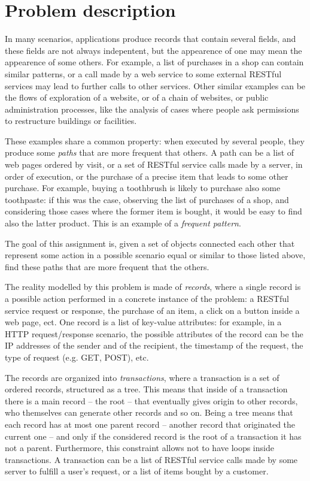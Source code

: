 \documentclass{acm_proc_article-sp-sigmod09}
\begin{document}
\section{Problem description}
In many scenarios, applications produce records that contain several fields, and these fields are not always indepentent, but the appearence of one may mean the appearence of some others. For example, a list of purchases in a shop can contain similar patterns, or a call made by a web service to some external RESTful services may lead to further calls to other services. Other similar examples can be the flows of exploration of a website, or of a chain of websites, or public administration processes, like the analysis of cases where people ask permissions to restructure buildings or facilities. 

These examples share a common property: when executed by several people, they produce some \emph{paths} that are more frequent that others. A path can be a list of web pages ordered by visit, or a set of RESTful service calls made by a server, in order of execution, or the purchase of a precise item that leads to some other purchase. For example, buying a toothbrush is likely to purchase also some toothpaste: if this was the case, observing the list of purchases of a shop, and considering those cases where the former item is bought, it would be easy to find also the latter product. This is an example of a \emph{frequent pattern}.

The goal of this assignment is, given a set of objects connected each other that represent some action in a possible scenario equal or similar to those listed above, find these paths that are more frequent that the others. 

The reality modelled by this problem is made of \emph{records}, where a single record is a possible action performed in a concrete instance of the problem: a RESTful service request or response, the purchase of an item, a click on a button inside a web page, ect. One record is a list of key-value attributes: for example, in a HTTP request/response scenario, the possible attributes of the record can be the IP addresses of the sender and of the recipient, the timestamp of the request, the type of request (e.g. GET, POST), etc. 

The records are organized into \emph{transactions}, where a transaction is a set of ordered records, structured as a tree. This means that inside of a transaction there is a main record -- the root -- that eventually gives origin to other records, who themselves can generate other records and so on. Being a tree means that each record has at most one parent record -- another record that originated the current one -- and only if the considered record is the root of a transaction it has not a parent. Furthermore, this constraint allows not to have loops inside transactions. A transaction can be a list of RESTful service calls made by some server to fulfill a user's request, or a list of items bought by a customer.
\end{document}
